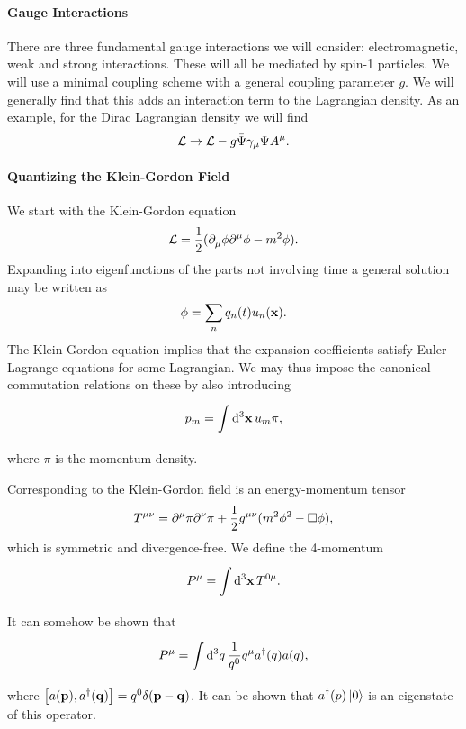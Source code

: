 \paragraph{Gauge Interactions}
There are three fundamental gauge interactions we will consider: electromagnetic, weak and strong interactions. These will all be mediated by spin-1 particles. We will use a minimal coupling scheme with a general coupling parameter $g$. We will generally find that this adds an interaction term to the Lagrangian density. As an example, for the Dirac Lagrangian density we will find
\begin{align*}
	\mathcal{L} \to \mathcal{L} - g\bar{\Psi}\gamma_{\mu}\Psi A^{\mu}.
\end{align*}

\paragraph{Quantizing the Klein-Gordon Field}
We start with the Klein-Gordon equation
\begin{align*}
	\mathcal{L} = \frac{1}{2}(\partial^{}_{\mu}\phi\partial^{\mu}_{}\phi - m^{2}\phi).
\end{align*}
Expanding into eigenfunctions of the parts not involving time a general solution may be written as
\begin{align*}
	\phi = \sum\limits_{n}q_{n}(t)u_{n}(\vb{x}).
\end{align*}
The Klein-Gordon equation implies that the expansion coefficients satisfy Euler-Lagrange equations for some Lagrangian. We may thus impose the canonical commutation relations on these by also introducing
\begin{align*}
	p_{m} = \int\limits_{}^{}\dd[3]{\vb{x}}u_{m}\pi,
\end{align*}
where $\pi$ is the momentum density.

Corresponding to the Klein-Gordon field is an energy-momentum tensor
\begin{align*}
	T^{\mu\nu} = \partial^{\mu}_{}\pi\partial^{\nu}_{}\pi + \frac{1}{2}g^{\mu\nu}(m^{2}\phi^{2} - \square \phi),
\end{align*}
which is symmetric and divergence-free. We define the 4-momentum
\begin{align*}
	P^{\mu} = \int\limits_{}^{}\dd[3]{\vb{x}}T^{0\mu}.
\end{align*}
It can somehow be shown that
\begin{align*}
	P^{\mu} = \int\limits_{}^{}\dd[3]{q}\frac{1}{q^{0}}q^{\mu}a^{\dagger}(q)a(q),
\end{align*}
where $\comm{a(\vb{p})}{a\adj(\vb{q})} = q^{0}\delta(\vb{p} - \vb{q})$. It can be shown that $a^{\dagger}(p)\ket{0}$ is an eigenstate of this operator.

